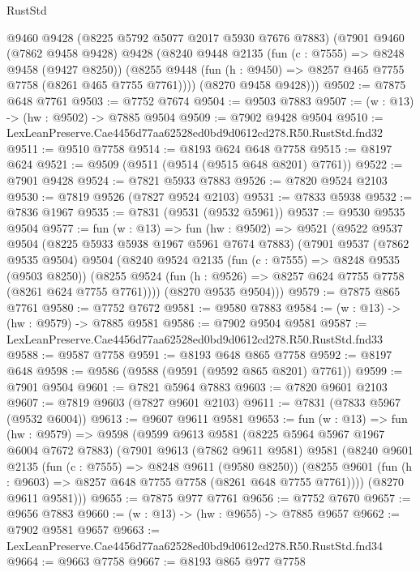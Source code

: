 \begin{lexlean}{RustStd}
\begin{coremodule}
      @9460
      @9428
      (@8225 @5792 @5077 @2017 @5930 @7676 @7883)
      (@7901
        @9460
        (@7862 @9458 @9428)
        @9428
        (@8240
          @9448
          @2135
          (fun (c : @7555) => @8248 @9458 (@9427 @8250))
          (@8255 @9448 (fun (h : @9450) => @8257 @465 @7755 @7758 (@8261 @465 @7755 @7761))))
        (@8270 @9458 @9428)))
@9502 := @7875 @648 @7761
@9503 := @7752 @7674
@9504 := @9503 @7883
@9507 := (w : @13) -> (hw : @9502) -> @7885 @9504
@9509 := @7902 @9428 @9504
@9510 := LexLeanPreserve.Cae4456d77aa62528ed0bd9d0612cd278.R50.RustStd.fnd32
@9511 := @9510 @7758
@9514 := @8193 @624 @648 @7758
@9515 := @8197 @624
@9521 := @9509 (@9511 (@9514 (@9515 @648 @8201) @7761))
@9522 := @7901 @9428
@9524 := @7821 @5933 @7883
@9526 := @7820 @9524 @2103
@9530 := @7819 @9526 (@7827 @9524 @2103)
@9531 := @7833 @5938
@9532 := @7836 @1967
@9535 := @7831 (@9531 (@9532 @5961))
@9537 := @9530 @9535 @9504
@9577 := fun (w : @13) =>
  fun (hw : @9502) =>
  @9521
    (@9522
      @9537
      @9504
      (@8225 @5933 @5938 @1967 @5961 @7674 @7883)
      (@7901
        @9537
        (@7862 @9535 @9504)
        @9504
        (@8240
          @9524
          @2135
          (fun (c : @7555) => @8248 @9535 (@9503 @8250))
          (@8255 @9524 (fun (h : @9526) => @8257 @624 @7755 @7758 (@8261 @624 @7755 @7761))))
        (@8270 @9535 @9504)))
@9579 := @7875 @865 @7761
@9580 := @7752 @7672
@9581 := @9580 @7883
@9584 := (w : @13) -> (hw : @9579) -> @7885 @9581
@9586 := @7902 @9504 @9581
@9587 := LexLeanPreserve.Cae4456d77aa62528ed0bd9d0612cd278.R50.RustStd.fnd33
@9588 := @9587 @7758
@9591 := @8193 @648 @865 @7758
@9592 := @8197 @648
@9598 := @9586 (@9588 (@9591 (@9592 @865 @8201) @7761))
@9599 := @7901 @9504
@9601 := @7821 @5964 @7883
@9603 := @7820 @9601 @2103
@9607 := @7819 @9603 (@7827 @9601 @2103)
@9611 := @7831 (@7833 @5967 (@9532 @6004))
@9613 := @9607 @9611 @9581
@9653 := fun (w : @13) =>
  fun (hw : @9579) =>
  @9598
    (@9599
      @9613
      @9581
      (@8225 @5964 @5967 @1967 @6004 @7672 @7883)
      (@7901
        @9613
        (@7862 @9611 @9581)
        @9581
        (@8240
          @9601
          @2135
          (fun (c : @7555) => @8248 @9611 (@9580 @8250))
          (@8255 @9601 (fun (h : @9603) => @8257 @648 @7755 @7758 (@8261 @648 @7755 @7761))))
        (@8270 @9611 @9581)))
@9655 := @7875 @977 @7761
@9656 := @7752 @7670
@9657 := @9656 @7883
@9660 := (w : @13) -> (hw : @9655) -> @7885 @9657
@9662 := @7902 @9581 @9657
@9663 := LexLeanPreserve.Cae4456d77aa62528ed0bd9d0612cd278.R50.RustStd.fnd34
@9664 := @9663 @7758
@9667 := @8193 @865 @977 @7758

\end{coremodule}
\end{lexlean}
